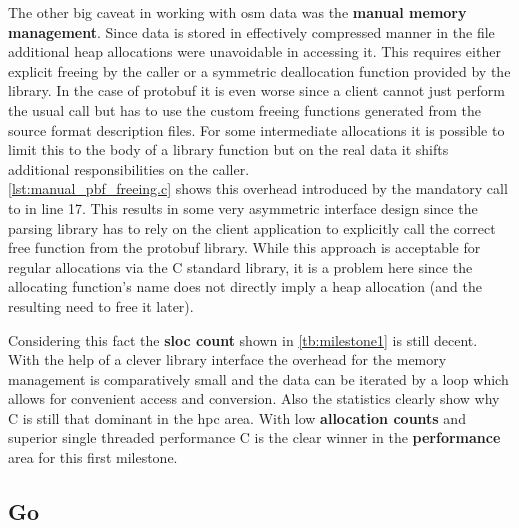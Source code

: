 The other big caveat in working with \gls{osm} data was the \textbf{manual memory management}. Since data is stored in effectively compressed manner in the file additional heap allocations were unavoidable in accessing it. This requires either explicit freeing by the caller or a symmetric deallocation function provided by the library. In the case of \gls{protobuf} it is even worse since a client cannot just perform the usual  call but has to use the custom freeing functions generated from the source  format description files. For some intermediate allocations it is possible to limit this to the body of a library function but on the real data it shifts additional responsibilities on the caller.
\\


\autoref{lst:manual_pbf_freeing.c} shows this overhead introduced by the mandatory call to  in line 17. This results in some very asymmetric interface design since the parsing library has to rely on the client application to explicitly call the correct free function from the \gls{protobuf} library. While this approach is acceptable for regular allocations via the C standard library, it is a problem here since the allocating function's name  does not directly imply a heap allocation (and the resulting need to free it later).

Considering this fact the \textbf{\gls{sloc} count} shown in \autoref{tb:milestone1} is still decent. With the help of a clever library interface the overhead for the memory management is comparatively small and the data can be iterated by a  loop which allows for convenient access and conversion. Also the statistics clearly show why C is still that dominant in the \gls{hpc} area. With low \textbf{allocation counts} and superior single threaded performance C is the clear winner in the \textbf{performance} area for this first milestone.

\subsection{Go}
\label{subsec:Implementation::Counting::Go}


